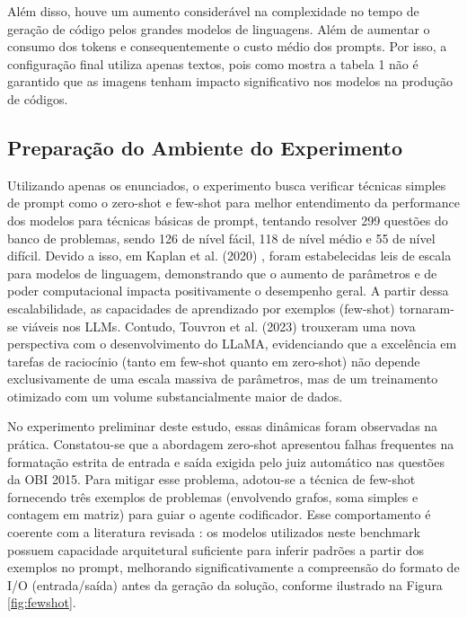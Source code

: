 \documentclass[12pt]{article}
\begin{document}
Além disso, houve um aumento considerável na complexidade no tempo de geração de código pelos grandes modelos de linguagens. Além de aumentar o consumo dos tokens e consequentemente o custo médio dos prompts. Por isso, a configuração final utiliza apenas textos, pois como mostra a tabela 1 não é garantido que as imagens tenham impacto significativo nos modelos na produção de códigos.

\subsection{Preparação do Ambiente do Experimento}

Utilizando apenas os enunciados, o experimento busca verificar técnicas simples de prompt como o zero-shot e few-shot para melhor entendimento da performance dos modelos para técnicas básicas de prompt, tentando resolver 299 questões do banco de problemas, sendo 126 de nível fácil, 118 de nível médio e 55 de nível difícil. Devido a isso, em Kaplan et al. (2020) \cite{kaplan2020scaling}, foram estabelecidas leis de escala para modelos de linguagem, demonstrando que o aumento de parâmetros e de poder computacional impacta positivamente o desempenho geral. A partir dessa escalabilidade, as capacidades de aprendizado por exemplos (few-shot) tornaram-se viáveis nos LLMs. Contudo, Touvron et al. (2023) \cite{touvron2023llama} trouxeram uma nova perspectiva com o desenvolvimento do LLaMA, evidenciando que a excelência em tarefas de raciocínio (tanto em few-shot quanto em zero-shot) não depende exclusivamente de uma escala massiva de parâmetros, mas de um treinamento otimizado com um volume substancialmente maior de dados.

No experimento preliminar deste estudo, essas dinâmicas foram observadas na prática. Constatou-se que a abordagem zero-shot apresentou falhas frequentes na formatação estrita de entrada e saída exigida pelo juiz automático nas questões da OBI 2015. Para mitigar esse problema, adotou-se a técnica de few-shot fornecendo três exemplos de problemas (envolvendo grafos, soma simples e contagem em matriz) para guiar o agente codificador. Esse comportamento é coerente com a literatura revisada \cite{brown2020language}: os modelos utilizados neste benchmark possuem capacidade arquitetural suficiente para inferir padrões a partir dos exemplos no prompt, melhorando significativamente a compreensão do formato de I/O (entrada/saída) antes da geração da solução, conforme ilustrado na Figura \ref{fig:fewshot}.
\end{document}
